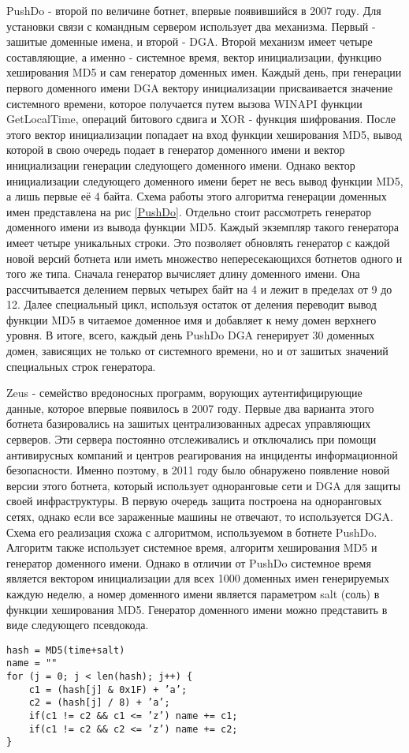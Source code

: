 PushDo - второй по величине ботнет, впервые появившийся в 2007 году. Для установки связи с командным сервером использует два механизма. Первый - зашитые доменные имена, и второй - DGA. Второй механизм имеет четыре составляющие, а именно - системное время, вектор инициализации, функцию хеширования MD5 и сам генератор доменных имен. Каждый день, при генерации первого доменного имени DGA вектору инициализации присваивается значение системного времени, которое получается путем вызова WINAPI функции GetLocalTime, операций битового сдвига и XOR - функция шифрования. После этого вектор инициализации попадает на вход функции хеширования MD5, вывод которой в свою очередь подает в генератор доменного имени и вектор инициализации генерации следующего доменного имени. Однако вектор инициализации следующего доменного имени берет не весь вывод функции MD5, а лишь первые её 4 байта. Схема работы этого алгоритма генерации доменных имен представлена на рис \ref{PushDo}.
Отдельно стоит рассмотреть генератор доменного имени из вывода функции MD5. Каждый экземпляр такого генератора имеет четыре уникальных строки. Это позволяет обновлять генератор с каждой новой версий ботнета или иметь множество непересекающихся ботнетов одного и того же типа. Сначала генератор вычисляет длину доменного имени. Она рассчитывается делением первых четырех байт на 4 и лежит в пределах от 9 до 12. Далее специальный цикл, используя остаток от деления переводит вывод функции MD5 в читаемое доменное имя и добавляет к нему домен верхнего уровня. В итоге, всего, каждый день PushDo DGA генерирует 30 доменных домен, зависящих не только от системного времени, но и от зашитых значений специальных строк генератора.

Zeus - семейство вредоносных программ, ворующих аутентифицирующие данные, которое впервые появилось в 2007 году. Первые два варианта этого ботнета базировались на зашитых централизованных адресах управляющих серверов. Эти сервера постоянно отслеживались и отключались при помощи антивирусных компаний и центров реагирования на инциденты информационной безопасности. Именно поэтому, в 2011 году было обнаружено появление новой версии этого ботнета, который использует одноранговые сети и DGA для защиты своей инфраструктуры. В первую очередь защита построена на одноранговых сетях, однако если все зараженные машины не отвечают, то используется DGA. Схема его реализация схожа с алгоритмом, используемом в ботнете PushDo. Алгоритм также использует системное время, алгоритм хеширования MD5 и генератор доменного имени. Однако в отличии от PushDo системное время является вектором инициализации для всех 1000 доменных имен генерируемых каждую неделю, а номер доменного имени является параметром salt (соль) в функции хеширования MD5. Генератор доменного имени можно представить в виде следующего псевдокода.
\begin{lstlisting}
hash = MD5(time+salt)
name = ""
for (j = 0; j < len(hash); j++) {
    c1 = (hash[j] & 0x1F) + ’a’;
    c2 = (hash[j] / 8) + ’a’;
    if(c1 != c2 && c1 <= ’z’) name += c1;
    if(c1 != c2 && c2 <= ’z’) name += c2;
}
\end{lstlisting}

